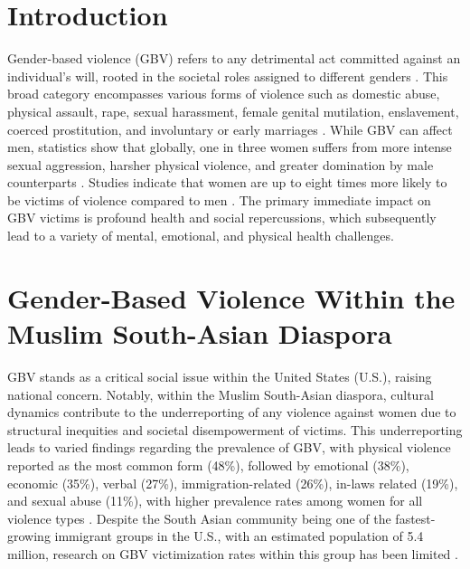 \documentclass[manuscript,screen]{acmart}
\begin{document}


\maketitle

\section{Introduction}
Gender-based violence (GBV) refers to any detrimental act committed against an individual's will, rooted in the societal roles assigned to different genders \cite{1}. This broad category encompasses various forms of violence such as domestic abuse, physical assault, rape, sexual harassment, female genital mutilation, enslavement, coerced prostitution, and involuntary or early marriages \cite{2,3}. While GBV can affect men, statistics show that globally, one in three women suffers from more intense sexual aggression, harsher physical violence, and greater domination by male counterparts \cite{1}. Studies indicate that women are up to eight times more likely to be victims of violence compared to men \cite{4}. The primary immediate impact on GBV victims is profound health and social repercussions, which subsequently lead to a variety of mental, emotional, and physical health challenges.

\section{Gender-Based Violence Within the Muslim South-Asian Diaspora}
GBV stands as a critical social issue within the United States (U.S.), raising national concern. Notably, within the Muslim South-Asian diaspora, cultural dynamics contribute to the underreporting of any violence against women due to structural inequities and societal disempowerment of victims. This underreporting leads to varied findings regarding the prevalence of GBV, with physical violence reported as the most common form (48\%), followed by emotional (38\%), economic (35\%), verbal (27\%), immigration-related (26\%), in-laws related (19\%), and sexual abuse (11\%), with higher prevalence rates among women for all violence types \cite{22}. Despite the South Asian community being one of the fastest-growing immigrant groups in the U.S., with an estimated population of 5.4 million, research on GBV victimization rates within this group has been limited \cite{23}.
\end{document}
